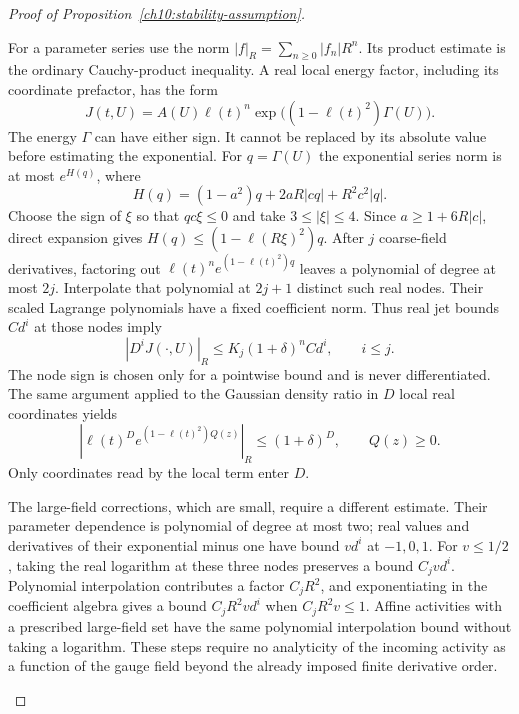 \begin{proof}[Proof of Proposition~\ref{ch10:stability-assumption}]
\begin{enumerate}[label=\emph{Step \arabic*.},ref=\arabic*,leftmargin=*,align=left]
For a parameter series use the norm
$|f|_R=\sum_{n\ge0}|f_n|R^n$. Its product estimate is the ordinary
Cauchy-product inequality. A real local energy factor, including its
coordinate prefactor, has the form
\[
 J(t,U)=A(U)\ell(t)^n\exp\bigl((1-\ell(t)^2)\Gamma(U)\bigr).
\]
The energy $\Gamma$ can have either sign. It cannot be replaced by
its absolute value before estimating the exponential.
For $q=\Gamma(U)$ the exponential series norm is at most $e^{H(q)}$,
where
\[
 H(q)=(1-a^2)q+2aR|cq|+R^2c^2|q|.
\]
Choose the sign of $\xi$ so that $q c\xi\le0$ and take
$3\le|\xi|\le4$. Since $a\ge1+6R|c|$, direct expansion gives
$H(q)\le(1-\ell(R\xi)^2)q$. After $j$ coarse-field derivatives,
factoring out $\ell(t)^n e^{(1-\ell(t)^2)q}$ leaves a polynomial
of degree at most $2j$. Interpolate that polynomial at $2j+1$
distinct such real nodes. Their scaled Lagrange polynomials have a
fixed coefficient norm. Thus real jet bounds $C d^i$ at those nodes
imply
\begin{equation}\label{ch10:real-node-bound}
 |D^iJ(\cdot,U)|_R\le K_j(1+\delta)^n C d^i,
                   \qquad i\le j.
\end{equation}
The node sign is chosen only for a pointwise bound and is never
differentiated. The same argument applied to the Gaussian density
ratio in $D$ local real coordinates yields
\[
 \left|\ell(t)^D e^{(1-\ell(t)^2)Q(z)}\right|_R
 \le(1+\delta)^D,\qquad Q(z)\ge0.
\]
Only coordinates read by the local term enter $D$.

The large-field corrections, which are small, require a different estimate. Their
parameter dependence is polynomial of degree at most two; real
values and derivatives of their exponential minus one have bound
$v d^i$ at $-1,0,1$. For $v\le1/2$, taking the real logarithm at
these three nodes preserves a bound $C_jv d^i$. Polynomial
interpolation contributes a factor $C_jR^2$, and exponentiating in the coefficient
algebra gives a bound $C_jR^2v d^i$ when $C_jR^2v\le1$.
Affine activities with a prescribed large-field set have the same polynomial interpolation
bound without taking a logarithm. These steps require no
analyticity of the incoming activity as a function of the gauge
field beyond the already imposed finite derivative order.


\end{enumerate}
\end{proof}
